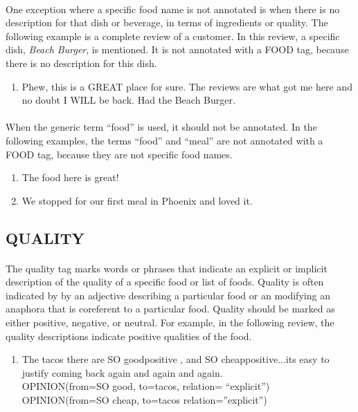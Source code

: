\documentclass{article}
\begin{document}
\paragraph{}
One exception where a specific food name is not annotated is when there is no description for that dish or beverage, in terms of ingredients or quality. The following example is a complete review of a customer. In this review, a specific dish, \textit{Beach Burger}, is mentioned. It is not annotated with a FOOD tag, because there is no description for this dish.

\begin{enumerate}[resume]
\item Phew, this is a GREAT place for sure. The reviews are what got me here and no doubt I WILL be back. Had the Beach Burger.
\end{enumerate}

\paragraph{}
When the generic term ``food'' is used, it should not be annotated. In the following examples, the terms ``food'' and ``meal'' are not annotated with a FOOD tag, because they are not specific food names. 
\begin{enumerate}[resume]
\item The food here is great!
\item We stopped for our first meal in Phoenix and loved it.
\end{enumerate}


\subsection{QUALITY}
\paragraph{}
The quality tag marks words or phrases that indicate an explicit or implicit description of the quality of a specific food or list of foods. Quality is often indicated by by an adjective describing a particular food or an modifying an anaphora that is coreferent to a particular food. Quality should be marked as either positive, negative, or neutral. For example, in the following review, the quality descriptions indicate positive qualities of the food.

\begin{enumerate}[resume]
\item The tacos there are SO goodpositive , and SO cheappositive...its easy to justify coming back again and again and again.\\
OPINION(from=SO good, to=tacos, relation= “explicit”)\\
OPINION(from=SO cheap, to=tacos relation=”explicit”)
\end{enumerate}
\end{document}
